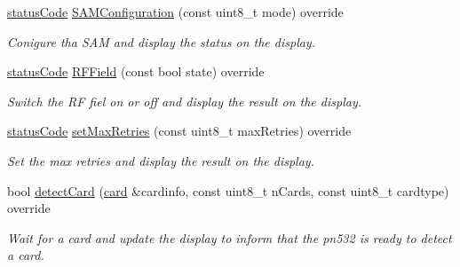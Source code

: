 \begin{DoxyCompactItemize}
\mbox{\label{classnfc_1_1NfcOled_a1779648dbd03771141b98ac604ba7982}} 
\hyperlink{declarations_8h_ae1d20c5a38cae82ccaa6a77be3fd264b}{status\+Code} \hyperlink{classnfc_1_1NfcOled_a1779648dbd03771141b98ac604ba7982}{S\+A\+M\+Configuration} (const uint8\+\_\+t mode) override
\begin{DoxyCompactList}\small\item\em Conigure tha S\+AM and display the status on the display. \end{DoxyCompactList}\item 
\mbox{\label{classnfc_1_1NfcOled_a708a50eec4640caca921af9958c43972}} 
\hyperlink{declarations_8h_ae1d20c5a38cae82ccaa6a77be3fd264b}{status\+Code} \hyperlink{classnfc_1_1NfcOled_a708a50eec4640caca921af9958c43972}{R\+F\+Field} (const bool state) override
\begin{DoxyCompactList}\small\item\em Switch the RF fiel on or off and display the result on the display. \end{DoxyCompactList}\item 
\mbox{\label{classnfc_1_1NfcOled_a1c64d60d6008551a530d668acbdb5ede}} 
\hyperlink{declarations_8h_ae1d20c5a38cae82ccaa6a77be3fd264b}{status\+Code} \hyperlink{classnfc_1_1NfcOled_a1c64d60d6008551a530d668acbdb5ede}{set\+Max\+Retries} (const uint8\+\_\+t max\+Retries) override
\begin{DoxyCompactList}\small\item\em Set the max retries and display the result on the display. \end{DoxyCompactList}\item 
\mbox{\label{classnfc_1_1NfcOled_a8c233683d71236d6238d840eeeb5d626}} 
bool \hyperlink{classnfc_1_1NfcOled_a8c233683d71236d6238d840eeeb5d626}{detect\+Card} (\hyperlink{classcard}{card} \&cardinfo, const uint8\+\_\+t n\+Cards, const uint8\+\_\+t cardtype) override
\begin{DoxyCompactList}\small\item\em Wait for a card and update the display to inform that the pn532 is ready to detect a card. \end{DoxyCompactList}\item 
\mbox{\label{classnfc_1_1NfcOled_a7ae4a0942240950d8db41b75c898cb3c}} 

\end{DoxyCompactItemize}
